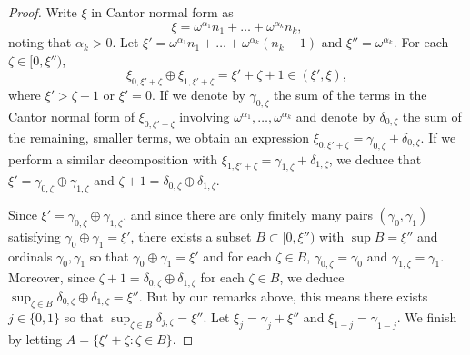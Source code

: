 \documentclass[12pt]{amsart}
\theoremstyle{definition}
\begin{document}
\begin{proof} Write $\xi$ in Cantor normal form as $$\xi=\omega^{\alpha_1}n_1+\ldots +\omega^{\alpha_k}n_k,$$ noting that $\alpha_k>0$.  Let $\xi'=\omega^{\alpha_1}n_1+\ldots + \omega^{\alpha_k}(n_k-1)$ and $\xi''= \omega^{\alpha_k}$.  For each $\zeta\in [0, \xi'')$, $$\xi_{0, \xi'+\zeta}\oplus \xi_{1, \xi'+\zeta}= \xi'+\zeta+1\in (\xi', \xi),$$  where $\xi'>\zeta+1$ or $\xi'=0$.  If we denote by $\gamma_{0, \zeta}$ the sum of the terms in the Cantor normal form of $\xi_{0, \xi'+\zeta}$ involving $\omega^{\alpha_1}, \ldots, \omega^{\alpha_k}$ and denote by $\delta_{0, \zeta}$ the sum of the remaining, smaller terms, we obtain an expression $\xi_{0, \xi'+\zeta}= \gamma_{0,\zeta}+\delta_{0,\zeta}$.  If we perform a similar decomposition with $\xi_{1, \xi'+\zeta}= \gamma_{1, \zeta}+\delta_{1, \zeta}$, we deduce that $\xi'=\gamma_{0,\zeta}\oplus \gamma_{1, \zeta}$ and $\zeta+1= \delta_{0,\zeta}\oplus \delta_{1, \zeta}$.  

Since $\xi'= \gamma_{0, \zeta}\oplus \gamma_{1, \zeta}$, and since there are only finitely many pairs $(\gamma_0, \gamma_1)$ satisfying $\gamma_0\oplus \gamma_1=\xi'$, there exists a subset $B\subset [0, \xi'')$ with $\sup B=\xi''$ and ordinals $\gamma_0, \gamma_1$ so that $\gamma_0\oplus \gamma_1=\xi'$ and for each $\zeta\in B$, $\gamma_{0, \zeta}=\gamma_0$ and $\gamma_{1, \zeta}=\gamma_1$.  Moreover, since $\zeta+1=\delta_{0,\zeta}\oplus \delta_{1, \zeta}$ for each $\zeta\in B$, we deduce $\sup_{\zeta\in B} \delta_{0, \zeta}\oplus \delta_{1, \zeta}=\xi''$.  But by our remarks above, this means there exists $j\in \{0,1\}$ so that $\sup_{\zeta\in B} \delta_{j, \zeta}=\xi''$.  Let $\xi_j= \gamma_j+\xi''$ and $\xi_{1-j}= \gamma_{1-j}$.  We finish by letting $A= \{\xi'+\zeta: \zeta\in B\}$.   






\end{proof}
\end{document}
